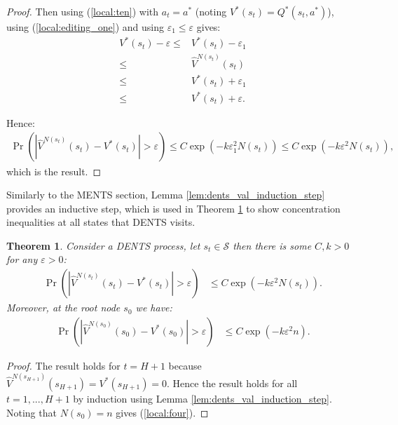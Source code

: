 \documentclass{article}
\newcommand{\cl}[1]{\mathcal{#1}}
\newcommand{\Vt}[2]{\hat{V}^{#2}(#1)}
\theoremstyle{plain}
\newtheorem{theorem}{Theorem}[section]
\begin{document}
\begin{appendices}
\begin{proof}
            Then using (\ref{local:ten}) with $a_t=a^*$ (noting $V^*(s_t)=Q^*(s_t,a^*)$), using (\ref{local:editing_one}) and using $\varepsilon_1 \leq \varepsilon$ gives:
            \begin{align}
                V^*(s_t) - \varepsilon
                    \leq& V^*(s_t) - \varepsilon_1 \\
                    \leq& \Vt{s_t}{N(s_t)} \\
                    \leq& V^*(s_t) + \varepsilon_1 \\
                    \leq& V^*(s_t) + \varepsilon. 
            \end{align}
            
            Hence:
            \begin{align}
                \Pr\left(\left|\Vt{s_t}{N(s_t)}-V^*(s_t)\right| > \varepsilon\right) 
                    \leq C \exp(-k \varepsilon_1^2 N(s_t)) 
                    \leq C \exp(-k \varepsilon^2 N(s_t)),
            \end{align}
            which is the result.
        \end{proof}








        
    
        Similarly to the MENTS section, Lemma \ref{lem:dents_val_induction_step} provides an inductive step, which is used in Theorem \ref{thrm:dents_val_converge} to show concentration inequalities at all states that DENTS visits.
        
        \begin{theorem} \label{thrm:dents_val_converge}
            Consider a DENTS process, let $s_t\in\cl{S}$ then there is some $C,k>0$ for any $\varepsilon>0$:
            \begin{align}
                \Pr\left(\left| \Vt{s_{t}}{N(s_{t})} - V^*(s_{t}) \right| > \varepsilon \right) 
                    &\leq C\exp\left( -k\varepsilon^2 N(s_{t}) \right).
            \end{align}
            Moreover, at the root node $s_0$ we have:
            \begin{align}
                \Pr\left(\left| \Vt{s_{0}}{N(s_{0})} - V^*(s_0) \right| > \varepsilon \right) 
                    &\leq C\exp\left( -k\varepsilon^2 n \right). \label{local:four}
            \end{align}
        \end{theorem}
        \begin{proof}
            The result holds for $t=H+1$ because $\Vt{s_{H+1}}{N(s_{H+1})}=V^*(s_{H+1})=0$. Hence the result holds for all $t=1,...,H+1$ by induction using Lemma \ref{lem:dents_val_induction_step}. Noting that $N(s_0)=n$ gives (\ref{local:four}).
        \end{proof}
    






\end{appendices}
\end{document}
